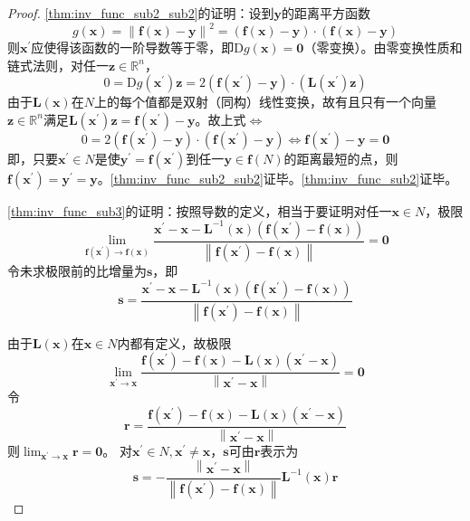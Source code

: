 \documentclass[../main.tex]{subfiles}
\begin{document}
\begin{proof}
    \ref{thm:inv_func_sub2_sub2}的证明：设到$\mathbf{y}$的距离平方函数
    \[
        g\left(\mathbf{x}\right)=\left\|\mathbf{f}\left(\mathbf{x}\right)-\mathbf{y}\right\|^2=\left(\mathbf{f}\left(\mathbf{x}\right)-\mathbf{y}\right)\cdot\left(\mathbf{f}\left(\mathbf{x}\right)-\mathbf{y}\right)\]
    则$\mathbf{x}^\prime$应使得该函数的一阶导数等于零，即$\mathrm{D}g\left(\mathbf{x}\right)=\mathbf{0}$（零变换）。由零变换性质和链式法则，对任一$\mathbf{z}\in\mathbb{R}^n$，
    \[0=\mathrm{D}g\left(\mathbf{x}^\prime\right)\mathbf{z}=2\left(\mathbf{f}\left(\mathbf{x}^\prime\right)-\mathbf{y}\right)\cdot\left(\mathbf{L}\left(\mathbf{x}^\prime\right)\mathbf{z}\right)\]
    由于$\mathbf{L}\left(\mathbf{x}\right)$在$N$上的每个值都是双射（同构）线性变换，故有且只有一个向量$\mathbf{z}\in\mathbb{R}^n$满足$\mathbf{L}\left(\mathbf{x}^\prime\right)\mathbf{z}=\mathbf{f}\left(\mathbf{x}^\prime\right)-\mathbf{y}$。故上式$\Leftrightarrow$
    \[0=2\left(\mathbf{f}\left(\mathbf{x}^\prime\right)-\mathbf{y}\right)\cdot\left(\mathbf{f}\left(\mathbf{x}^\prime\right)-\mathbf{y}\right)\Leftrightarrow\mathbf{f}\left(\mathbf{x}^\prime\right)-\mathbf{y}=\mathbf{0}\]
    即，只要$\mathbf{x}^\prime\in N$是使$\mathbf{y}^\prime=\mathbf{f}\left(\mathbf{x}^\prime\right)$到任一$\mathbf{y}\in \mathbf{f}\left(N\right)$的距离最短的点，则$\mathbf{f}\left(\mathbf{x}^\prime\right)=\mathbf{y}^\prime=\mathbf{y}$。\ref{thm:inv_func_sub2_sub2}证毕。\ref{thm:inv_func_sub2}证毕。

    \ref{thm:inv_func_sub3}的证明：按照导数的定义，相当于要证明对任一$\mathbf{x}\in N$，极限
    \[\lim_{\mathbf{f}\left(\mathbf{x}^\prime\right)\to\mathbf{f}\left(\mathbf{x}\right)}\frac{\mathbf{x}^\prime-\mathbf{x}-\mathbf{L}^{-1}\left(\mathbf{x}\right)\left(\mathbf{f}\left(\mathbf{x}^\prime\right)-\mathbf{f}\left(\mathbf{x}\right)\right)}{\left\|\mathbf{f}\left(\mathbf{x}^\prime\right)-\mathbf{f}\left(\mathbf{x}\right)\right\|}=\mathbf{0}\]
    令未求极限前的比增量为$\mathbf{s}$，即
    \[\mathbf{s}=\frac{\mathbf{x}^\prime-\mathbf{x}-\mathbf{L}^{-1}\left(\mathbf{x}\right)\left(\mathbf{f}\left(\mathbf{x}^\prime\right)-\mathbf{f}\left(\mathbf{x}\right)\right)}{\left\|\mathbf{f}\left(\mathbf{x}^\prime\right)-\mathbf{f}\left(\mathbf{x}\right)\right\|}\]

    由于$\mathbf{L}\left(\mathbf{x}\right)$在$\mathbf{x}\in N$内都有定义，故极限
    \[\lim_{\mathbf{x}^\prime\to\mathbf{x}}\frac{\mathbf{f}\left(\mathbf{x}^\prime\right)-\mathbf{f}\left(\mathbf{x}\right)-\mathbf{L}\left(\mathbf{x}\right)\left(\mathbf{x}^\prime-\mathbf{x}\right)}{\left\|\mathbf{x}^\prime-\mathbf{x}\right\|}=\mathbf{0}\]
    令
    \[\mathbf{r}=\frac{\mathbf{f}\left(\mathbf{x}^\prime\right)-\mathbf{f}\left(\mathbf{x}\right)-\mathbf{L}\left(\mathbf{x}\right)\left(\mathbf{x}^\prime-\mathbf{x}\right)}{\left\|\mathbf{x}^\prime-\mathbf{x}\right\|}\]
    则$\lim_{\mathbf{x}^\prime\to\mathbf{x}}\mathbf{r}=\mathbf{0}$。
    对$\mathbf{x}^\prime\in N,\mathbf{x}^\prime\neq\mathbf{x}$，$\mathbf{s}$可由$\mathbf{r}$表示为
    \[
        \mathbf{s}=-\frac{\left\|\mathbf{x}^\prime-\mathbf{x}\right\|}{\left\|\mathbf{f}\left(\mathbf{x}^\prime\right)-\mathbf{f}\left(\mathbf{x}\right)\right\|}\mathbf{L}^{-1}\left(\mathbf{x}\right)\mathbf{r}
    \]


\end{proof}
\end{document}

